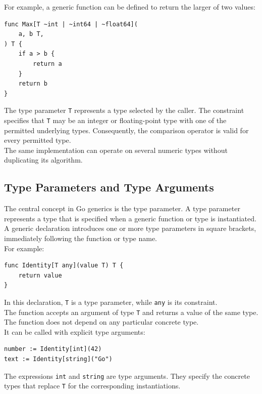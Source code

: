 For example, a generic function can be defined to return the larger of two values:

\begin{lstlisting}
func Max[T ~int | ~int64 | ~float64](
    a, b T,
) T {
    if a > b {
        return a
    }
    return b
}
\end{lstlisting}

The type parameter \texttt{T} represents a type selected by the caller. The constraint specifies that \texttt{T} may be an integer or floating-point type with one of the permitted underlying types. Consequently, the comparison operator is valid for every permitted type.\\

The same implementation can operate on several numeric types without duplicating its algorithm.

\subsection{Type Parameters and Type Arguments}

The central concept in Go generics is the type parameter. A type parameter represents a type that is specified when a generic function or type is instantiated.\\

A generic declaration introduces one or more type parameters in square brackets, immediately following the function or type name.\\

For example:

\begin{lstlisting}
func Identity[T any](value T) T {
    return value
}
\end{lstlisting}

In this declaration, \texttt{T} is a type parameter, while \texttt{any} is its constraint.\\

The function accepts an argument of type \texttt{T} and returns a value of the same type. The function does not depend on any particular concrete type.\\

It can be called with explicit type arguments:

\begin{lstlisting}
number := Identity[int](42)
text := Identity[string]("Go")
\end{lstlisting}

The expressions \texttt{int} and \texttt{string} are type arguments. They specify the concrete types that replace \texttt{T} for the corresponding instantiations.\\

